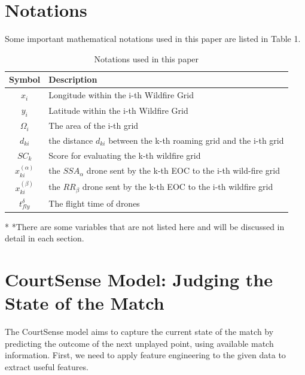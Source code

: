 \documentclass[12pt]{article}  %
\begin{document}

\section{Notations}
Some important mathematical notations used in this paper are listed in Table 1. 
\begin{table}[htbp]
\begin{center}
\caption{Notations used in this paper}
\begin{tabular}{c l}
\toprule[2pt]
\multicolumn{1}{m{3cm}}{\centering Symbol} & \multicolumn{1}{m{8cm}}{\centering Description }\\
\midrule
$x_i$ & Longitude within the i-th Wildfire Grid \\
$y_i$ & Latitude within the i-th Wildfire Grid \\
$\varOmega _i$ & The area of the i-th grid\\
$d_{ki}$ & the distance $d_{ki}$ between the k-th roaming grid and the i-th grid \\
$SC_k$ & Score for evaluating the k-th wildfire grid \\
\vspace{5pt}%
$x^{( \alpha )}_{ki}$ & the $SSA_\alpha$ drone sent by the k-th EOC to the i-th wild-fire grid\\
\vspace{3pt}
$x^{( \beta )}_{ki}$ & the $RR_\beta$ drone sent by the k-th EOC to the i-th wildfire grid\\
$t_{fly}^{\delta}$ & The flight time of drones\\
\bottomrule[2pt]
\end{tabular}\label{tb:notation}
 \begin{tablenotes}
        \footnotesize
        \item[*] *There are some variables that are not listed here and will be discussed in detail in each section. %
      \end{tablenotes}
\end{center}
\end{table}
\vspace{-1cm}%






\section{CourtSense Model: Judging the State of the Match}
The CourtSense model aims to capture the current state of the match by predicting the outcome of the next unplayed point, using available match information. First, we need to apply feature engineering to the given data to extract useful features.
\end{document}
